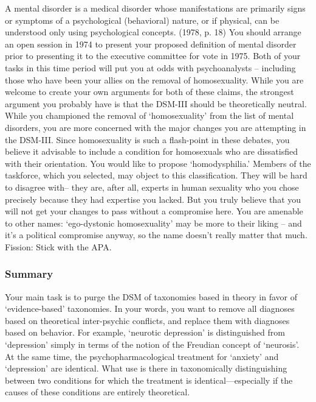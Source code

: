 A mental disorder is a medical disorder whose manifestations are primarily signs or symptoms of a psychological (behavioral) nature, or if physical, can be understood only using psychological concepts. (1978, p. 18)
You should arrange an open session in 1974 to present your proposed definition of mental disorder prior to presenting it to the executive committee for vote in 1975.
Both of your tasks in this time period will put you at odds with psychoanalysts – including those who have been your allies on the removal of homosexuality. While you are welcome to create your own arguments for both of these claims, the strongest argument you probably have is that the DSM-III should be theoretically neutral.\\
While you championed the removal of `homosexuality' from the list of mental disorders, you are more concerned with the major changes you are attempting in the DSM-III. Since homosexuality is such a flash-point in these debates, you believe it advisable to include a condition for homosexuals who are dissatisfied with their orientation. You would like to propose `homodysphilia.' Members of the taskforce, which you selected, may object to this classification. They will be hard to disagree with-- they are, after all, experts in human sexuality who you chose precisely because they had expertise you lacked. But you truly believe that you will not get your changes to pass without a compromise here.
You are amenable to other names: `ego-dystonic homosexuality' may be more to their liking – and it's a political compromise anyway, so the name doesn't really matter that much.
Fission: Stick with the APA.

\subsubsection{Summary}
\label{summary}

Your main task is to purge the DSM of taxonomies based in theory in favor of `evidence-based' taxonomies. In your words, you want to remove all diagnoses based on theoretical inter-psychic conflicts, and replace them with diagnoses based on behavior. For example, `neurotic depression' is distinguished from `depression' simply in terms of the notion of the Freudian concept of `neurosis'. At the same time, the psychopharmacological treatment for `anxiety' and `depression' are identical. What use is there in taxonomically distinguishing between two conditions for which the treatment is identical—especially if the causes of these conditions are entirely theoretical.


